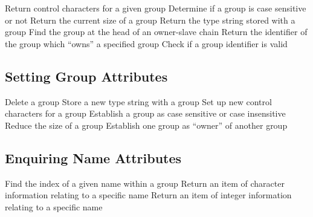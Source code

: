             {Return control characters for a given group}
            {Determine if a group is case sensitive or not}
            {Return the current size of a group}
            {Return the type string stored with a group}
            {Find the group at the head of an owner-slave chain}
            {Return the identifier of the group which ``owns'' a specified
group}
            {Check if a group identifier is valid}


\subsection{Setting Group Attributes}

            {Delete a group}
            {Store a new type string with a group}
            {Set up new control characters for a group}
            {Establish a group as case sensitive or case insensitive}
            {Reduce the size of a group}
            {Establish one group as ``owner'' of another group}


\subsection{Enquiring Name Attributes}

            {Find the index of a given name within a group}
            {Return an item of character information relating to a specific name}
            {Return an item of integer information relating to a specific name}



